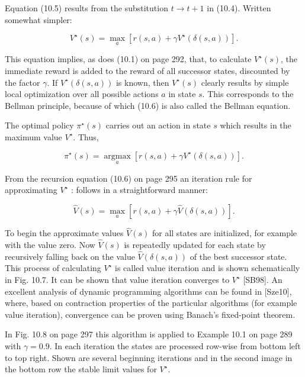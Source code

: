 \documentclass[10pt]{book}
\begin{document}
\begin{center}
\begin{enumerate}
\begin{center}
\begin{center}
\begin{center}
\begin{center}
Equation (10.5) results from the substitution $t \rightarrow t+1$ in (10.4). Written somewhat simpler:


\begin{equation*}
V^{\star}(s)=\max _{a}\left[r(s, a)+\gamma V^{\star}(\delta(s, a))\right] . \tag{10.6}
\end{equation*}


This equation implies, as does (10.1) on page 292, that, to calculate $V^{\star}(s)$, the immediate reward is added to the reward of all successor states, discounted by the factor $\gamma$. If $V^{\star}(\delta(s, a))$ is known, then $V^{\star}(s)$ clearly results by simple local optimization over all possible actions $a$ in state $s$. This corresponds to the Bellman principle, because of which (10.6) is also called the Bellman equation.

The optimal policy $\pi^{\star}(s)$ carries out an action in state $s$ which results in the maximum value $V^{\star}$. Thus,



\begin{equation*}
\pi^{\star}(s)=\underset{a}{\operatorname{argmax}}\left[r(s, a)+\gamma V^{\star}(\delta(s, a))\right] . \tag{10.7}
\end{equation*}


From the recursion equation (10.6) on page 295 an iteration rule for approximating $V^{\star}$ : follows in a straightforward manner:


\begin{equation*}
\hat{V}(s)=\max _{a}[r(s, a)+\gamma \hat{V}(\delta(s, a))] . \tag{10.8}
\end{equation*}


To begin the approximate values $\hat{V}(s)$ for all states are initialized, for example with the value zero. Now $\hat{V}(s)$ is repeatedly updated for each state by recursively falling back on the value $\hat{V}(\delta(s, a))$ of the best successor state. This process of calculating $V^{\star}$ is called value iteration and is shown schematically in Fig. 10.7. It can be shown that value iteration converges to $V^{\star}$ [SB98]. An excellent analysis of dynamic programming algorithms can be found in [Sze10], where, based on contraction properties of the particular algorithms (for example value iteration), convergence can be proven using Banach's fixed-point theorem.

In Fig. 10.8 on page 297 this algorithm is applied to Example 10.1 on page 289 with $\gamma=0.9$. In each iteration the states are processed row-wise from bottom left to top right. Shown are several beginning iterations and in the second image in the bottom row the stable limit values for $V^{\star}$.


\end{center}
\end{center}
\end{center}
\end{center}
\end{enumerate}
\end{center}
\end{document}
